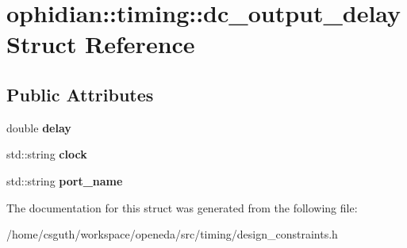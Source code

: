 \hypertarget{structophidian_1_1timing_1_1dc__output__delay}{\section{ophidian\-:\-:timing\-:\-:dc\-\_\-output\-\_\-delay Struct Reference}
\label{structophidian_1_1timing_1_1dc__output__delay}
}
\subsection*{Public Attributes}
\begin{DoxyCompactItemize}
\item 
\hypertarget{structophidian_1_1timing_1_1dc__output__delay_a5817ce5be0d8ff3a2b0ed115778de5c1}{double {\bfseries delay}}\label{structophidian_1_1timing_1_1dc__output__delay_a5817ce5be0d8ff3a2b0ed115778de5c1}

\item 
\hypertarget{structophidian_1_1timing_1_1dc__output__delay_a05b2de71eab4d3423ef16816641b301b}{std\-::string {\bfseries clock}}\label{structophidian_1_1timing_1_1dc__output__delay_a05b2de71eab4d3423ef16816641b301b}

\item 
\hypertarget{structophidian_1_1timing_1_1dc__output__delay_ad89255b944e212afbcbe2347d727ed9b}{std\-::string {\bfseries port\-\_\-name}}\label{structophidian_1_1timing_1_1dc__output__delay_ad89255b944e212afbcbe2347d727ed9b}

\end{DoxyCompactItemize}


The documentation for this struct was generated from the following file\-:\begin{DoxyCompactItemize}
\item 
/home/csguth/workspace/openeda/src/timing/design\-\_\-constraints.\-h\end{DoxyCompactItemize}
